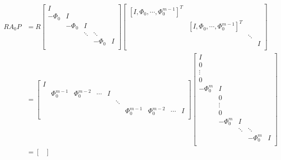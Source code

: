 \documentclass[3p]{elsarticle}
\begin{document}
\begin{align}
    R A_0 P
                            &= R
    \begin{bmatrix}
        I \\
        -\Phi_0 & I \\
              & -\Phi_0 & I \\
              &       & \ddots & \ddots \\
              &         &       & -\Phi_0 & I \\
    \end{bmatrix}
    \begin{bmatrix}
        [I, \Phi_0, \cdots, \Phi_0^{m - 1}]^T \\
        & [I, \Phi_0, \cdots, \Phi_0^{m - 1}]^T \\
        && \ddots \\
        &&& I \\
    \end{bmatrix} \nonumber \\
        &= \begin{bmatrix}
        I \\
        & \Phi_0^{m - 1} & \Phi_0^{m - 2} & \cdots & I \\
        &                        &                                &           &   & \ddots \\
        &                        &                                &           &   &        & \Phi_0^{m - 1} & \Phi_0^{m - 2} & \cdots & I \\
    \end{bmatrix}
    \begin{bmatrix}
        I \\
        0 \\
        \vdots \\
        0 \\
        -\Phi_0^m & I \\
                  & 0 \\
                  & \vdots \\
                  & 0 \\
                  & -\Phi_0^m & I \\
                  && \ddots & \ddots \\
                  &&        & -\Phi_0^m & I \\
    \end{bmatrix} \nonumber \\
            &= \begin{bmatrix}

\end{bmatrix}
\end{align}
\end{document}
